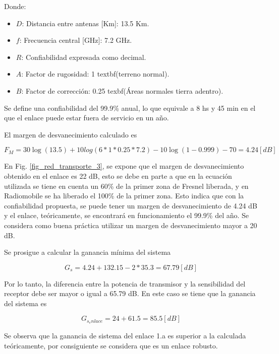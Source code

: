 \documentclass[12pt,a4paper]{book}
\begin{document}
Donde:

\begin{itemize}
\item $D$: Distancia entre antenas [Km]: 13.5 Km.
\item $f$: Frecuencia central [GHz]: 7.2 GHz.
\item $R$: Confiabilidad expresada como decimal.
\item $A$: Factor de rugosidad: 1 textbf{(terreno normal)}.
\item $B$: Factor de corrección: 0.25 texbf{(Áreas normales tierra adentro)}.
\end{itemize}

Se define una confiabilidad del 99.9\% anual, lo que equivale a 8 hs y 45 min en el que el enlace puede estar fuera de servicio en un año.

El margen de desvanecimiento calculado es

\begin{equation}\label{Barnet_resultado}
F_{M}= 30 \log(13.5) + 10 log(6 * 1 *0.25*7.2)- 10 \log(1-0.999) - 70= 4.24 [dB]
\end{equation}

En Fig. \ref{fig_red_transporte_3}, se expone que el margen de desvanecimiento obtenido en el enlace es 22 dB, esto se debe en parte a que en la ecuación utilizada se tiene en cuenta un 60\% de la primer zona de Fresnel liberada, y en Radiomobile se ha liberado el 100\% de la primer zona. Esto indica que con la confiabilidad propuesta, se puede tener un margen de desvanecimiento de 4.24 dB y el enlace, teóricamente, se encontrará en funcionamiento el 99.9\% del año. Se considera como buena práctica utilizar un margen de desvanecimiento mayor a 20 dB.

Se prosigue a calcular la ganancia mínima del sistema

\begin{equation}
G_{s}=4.24 + 132.15 - 2 * 35.3 = 67.79 [dB]
\end{equation}

Por lo tanto, la diferencia entre la potencia de transmisor y la sensibilidad del receptor debe ser mayor o igual a 65.79 dB. En este caso se tiene que la ganancia del sistema es

\begin{equation}
G_{s_enlace}= 24 + 61.5 = 85.5 [dB]
\end{equation}

Se observa que la ganancia de sistema del enlace 1.a es superior a la calculada teóricamente, por consiguiente se considera que es un enlace robusto.
\end{document}
